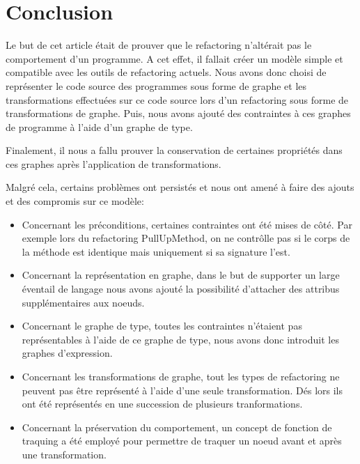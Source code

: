 \documentclass[a4paper, 12pt]{article}
\begin{document}
  \section{Conclusion}

  Le but de cet article était de prouver que le refactoring n'altérait pas le comportement d'un programme.
  A cet effet, il fallait créer un modèle simple et compatible avec les outils de refactoring actuels. Nous avons donc choisi de représenter le code source des programmes sous forme de graphe
  et les transformations effectuées sur ce code source lors d'un refactoring sous forme de transformations de graphe.
  Puis, nous avons ajouté des contraintes à ces graphes de programme à l'aide d'un graphe de type.

  Finalement, il nous a fallu prouver la conservation de certaines propriétés dans ces graphes après l'application de transformations.

  Malgré cela, certains problèmes ont persistés et nous ont amené à faire des ajouts et des compromis sur ce modèle:

  \begin{itemize}[label=\textbullet]
    \item Concernant les préconditions, certaines contraintes ont été mises de côté. Par exemple lors du refactoring PullUpMethod,
    on ne contrôlle pas si le corps de la méthode est identique mais uniquement si sa signature l'est.

    \item Concernant la représentation en graphe, dans le but de supporter un large éventail de langage nous avons ajouté la possibilité d'attacher des attribus supplémentaires aux noeuds.

    \item Concernant le graphe de type, toutes les contraintes n'étaient pas représentables à l'aide de ce graphe de type, nous avons donc introduit les graphes d'expression.

    \item Concernant les transformations de graphe, tout les types de refactoring ne peuvent pas être représenté à l'aide d'une seule transformation.
    Dés lors ils ont été représentés en une succession de plusieurs tranformations.

    \item Concernant la préservation du comportement, un concept de fonction de traquing a été employé pour permettre de traquer un noeud avant et après une transformation.
  \end{itemize}
\end{document}

